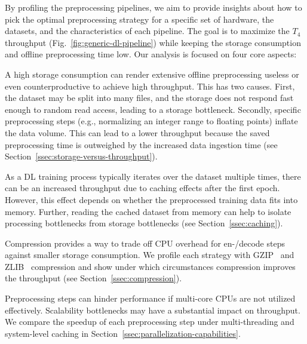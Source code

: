 By profiling the preprocessing pipelines, we aim to provide insights about how to pick the optimal preprocessing strategy for a specific set of hardware, the datasets, and the characteristics of each pipeline.
The goal is to maximize the $T_4$ throughput (Fig.~\ref{fig:generic-dl-pipeline}) while keeping the storage consumption and offline preprocessing time low.
Our analysis is focused on four core aspects:
\begin{description}[align=left]
    \item[Storage Consumption versus Throughput:] 

    {\color{diff}A high storage consumption can render extensive offline preprocessing useless or even counterproductive to achieve high throughput.
    This has two causes. First, the dataset may be split into many files, and the storage does not respond fast enough to random read access, leading to a storage bottleneck.
    Secondly, specific preprocessing steps (e.g., normalizing an integer range to floating points) inflate the data volume.
    This can lead to a lower throughput because the saved preprocessing time is outweighed by the increased data ingestion time (see Section~\ref{ssec:storage-versus-throughput}).}

    \item[Caching:]

    {\color{diff}As a DL training process typically iterates over the dataset multiple times, there can be an increased throughput due to caching effects after the first epoch.
    However, this effect depends on whether the preprocessed training data fits into memory.
    Further, reading the cached dataset from memory can help to isolate processing bottlenecks from storage bottlenecks (see Section~\ref{ssec:caching}).}

    \item[Compression:]

    {\color{diff}Compression provides a way to trade off CPU overhead for en-/decode steps against smaller storage consumption.
    We profile each strategy with GZIP~\cite{10.17487/RFC1952} and ZLIB~\cite{10.17487/RFC1950} compression and show under which circumstances compression improves the throughput (see Section~\ref{ssec:compression}).}



    \item[Parallelization Capabilities:]
    Preprocessing steps can hinder performance if multi-core CPUs are not utilized effectively.
    Scalability bottlenecks may have a substantial impact on throughput.
    We compare the speedup of each preprocessing step under multi-threading and {\color{diff}system-level caching} in Section~\ref{ssec:parallelization-capabilities}.

\end{description}
